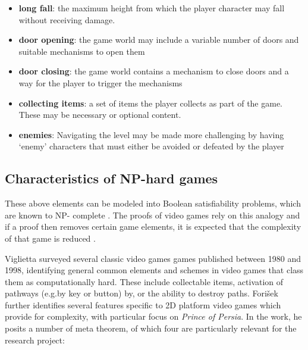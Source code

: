 \documentclass[11pt, a4paper, oneside]{report} %
\begin{document}
\begin{itemize}

  \item \textbf{long fall}: the maximum height from which the player character may fall without
                            receiving damage.

  \item \textbf{door opening}: the game world may include a variable number of doors and
                               suitable mechanisms to open them

  \item \textbf{door closing}: the game world contains a mechanism to close doors and a way for the
                               player to trigger the mechanisms

  \item \textbf{collecting items}: a set of items the player collects as part of the game. These may
                                   be necessary or optional content.

  \item \textbf{enemies}: Navigating the level may be made more challenging by having `enemy'
                          characters that must either be avoided or defeated by the player

\end{itemize}


\subsection{Characteristics of NP-hard games}

These above elements can be modeled into Boolean satisfiability problems, which
are known to NP- complete \cite{DBLP:conf/fun/Forisek10, cook1971complexity}.
The proofs of video games rely on this analogy and if a proof then removes
certain game elements, it is expected that the complexity of that game is
reduced \cite{viglietta2014gaming}.

Viglietta \cite{viglietta2014gaming} surveyed several classic video games games
published between 1980 and 1998, identifying general common elements and schemes
in video games that class them as computationally hard. These include
collectable items, activation of pathways (e.g.by key or button) by, or the
ability to destroy paths. Fori\v{s}ek \@\cite{DBLP:conf/fun/Forisek10} further
identifies several features specific to 2D platform video games which provide
for complexity, with particular focus on \textit{Prince of Persia}. In the work,
he posits a number of meta theorem, of which four are particularly relevant for
the research project:
\end{document}
